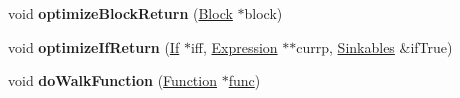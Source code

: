 \begin{DoxyCompactItemize}
\item 
\mbox{\label{structwasm_1_1_simplify_locals_a06c8bac8d8ecc6d7cca4ce8700bf162b}} 
void {\bfseries optimize\+Block\+Return} (\mbox{\hyperlink{classwasm_1_1_block}{Block}} $\ast$block)
\item 
\mbox{\label{structwasm_1_1_simplify_locals_a68f229b7ff7bbc830c9728926a92960f}} 
void {\bfseries optimize\+If\+Return} (\mbox{\hyperlink{classwasm_1_1_if}{If}} $\ast$iff, \mbox{\hyperlink{classwasm_1_1_expression}{Expression}} $\ast$$\ast$currp, \mbox{\hyperlink{classstd_1_1map}{Sinkables}} \&if\+True)
\item 
\mbox{\label{structwasm_1_1_simplify_locals_aa684fe273978ec55bffd6ed504208ae1}} 
void {\bfseries do\+Walk\+Function} (\mbox{\hyperlink{classwasm_1_1_function}{Function}} $\ast$\mbox{\hyperlink{structfunc}{func}})
\end{DoxyCompactItemize}
